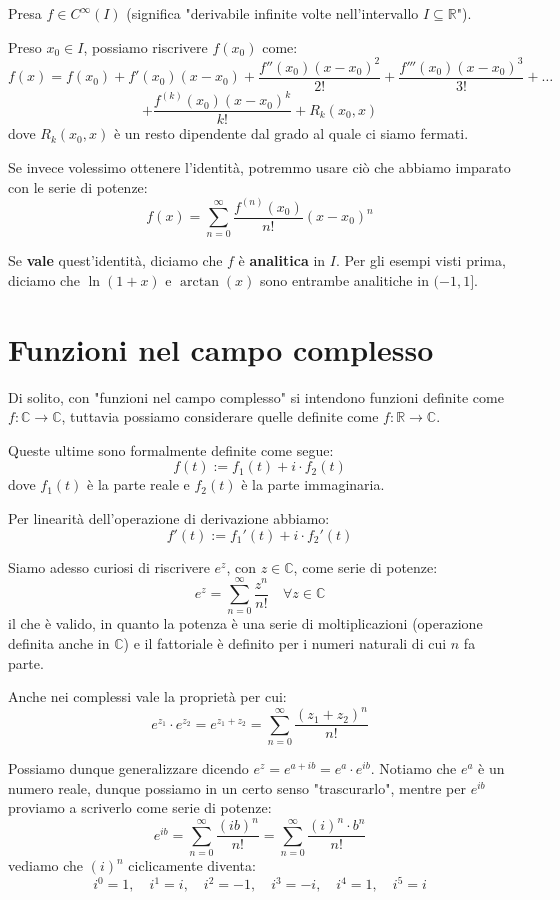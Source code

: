 \documentclass[12pt]{report}
\newcommand{\R}{\mathbb{R}}
\newcommand{\C}{\mathbb{C}}
\begin{document}
	Presa $f \in C^\infty(I)$ (significa "derivabile infinite volte nell'intervallo $I \subseteq \R$").
	
	Preso $x_0 \in I$, possiamo riscrivere $f(x_0)$ come:
	\[
	f(x) = f(x_0) + f'(x_0)(x - x_0) + \frac{f''(x_0)(x - x_0)^2}{2!} + \frac{f'''(x_0)(x - x_0)^3}{3!} + \dots
	\]
	\[
	+ \frac{f^{(k)}(x_0)(x - x_0)^k}{k!} + R_k(x_0, x)
	\]
	dove $R_k(x_0, x)$ è un resto dipendente dal grado al quale ci siamo fermati.
	
	Se invece volessimo ottenere l'identità, potremmo usare ciò che abbiamo imparato con le serie di potenze:
	\[
	f(x) = \sum_{n=0}^{\infty} \frac{f^{(n)}(x_0)}{n!} (x - x_0)^n
	\]
	
	Se \textbf{vale} quest'identità, diciamo che $f$ è \textbf{analitica} in $I$.
	Per gli esempi visti prima, diciamo che $\ln(1+x)$ e $\arctan(x)$ sono entrambe analitiche in $(-1, 1]$.
	
	\chapter{Funzioni nel campo complesso}
	Di solito, con "funzioni nel campo complesso" si intendono funzioni definite come $f: \C \to \C$, tuttavia possiamo considerare quelle definite come $f: \R \to \C$.
	
	Queste ultime sono formalmente definite come segue:
	\[
	f(t) := f_1(t) + i \cdot f_2(t)
	\]
	dove $f_1(t)$ è la parte reale e $f_2(t)$ è la parte immaginaria.
	
	Per linearità dell'operazione di derivazione abbiamo:
	\[
	f'(t) := f_1'(t) + i \cdot f_2'(t)
	\]
	
	Siamo adesso curiosi di riscrivere $e^z$, con $z \in \C$, come serie di potenze:
	\[
	e^z = \sum_{n=0}^{\infty} \frac{z^n}{n!} \quad \forall z \in \C
	\]
	il che è valido, in quanto la potenza è una serie di moltiplicazioni (operazione definita anche in $\C$) e il fattoriale è definito per i numeri naturali di cui $n$ fa parte.
	
	Anche nei complessi vale la proprietà per cui:
	\[
	e^{z_1} \cdot e^{z_2} = e^{z_1 + z_2} = \sum_{n=0}^{\infty} \frac{(z_1 + z_2)^n}{n!}
	\]
	
	Possiamo dunque generalizzare dicendo $e^z = e^{a+ib} = e^a \cdot e^{ib}$. 
	Notiamo che $e^a$ è un numero reale, dunque possiamo in un certo senso "trascurarlo", mentre per $e^{ib}$ proviamo a scriverlo come serie di potenze:
	\[
	e^{ib} = \sum_{n=0}^{\infty} \frac{(ib)^n}{n!} = \sum_{n=0}^{\infty} \frac{(i)^n \cdot b^n}{n!}
	\]
	vediamo che $(i)^n$ ciclicamente diventa:
	\[
	i^0 = 1, \quad i^1 = i, \quad i^2 = -1, \quad i^3 = -i, \quad i^4 = 1, \quad i^5 = i
	\]
	
\end{document}
